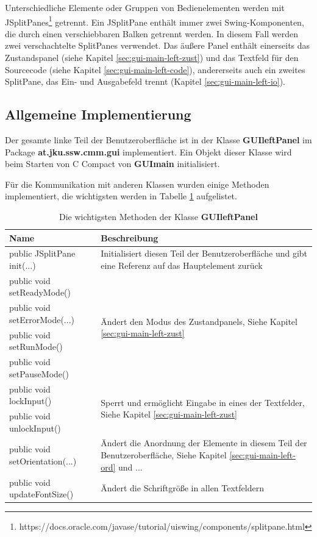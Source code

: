 Unterschiedliche Elemente oder Gruppen von Bedienelementen werden mit JSplitPanes\footnote{https://docs.oracle.com/javase/tutorial/uiswing/components/splitpane.html} getrennt. Ein JSplitPane enthält immer zwei Swing-Komponenten, die durch einen verschiebbaren Balken getrennt werden. In diesem Fall werden zwei verschachtelte SplitPanes verwendet. Das äußere Panel enthält einerseits das Zustandspanel (siehe Kapitel \ref{sec:gui-main-left-zust}) und das Textfeld für den Sourcecode (siehe Kapitel \ref{sec:gui-main-left-code}), andererseits auch ein zweites SplitPane, das Ein- und Ausgabefeld trennt (Kapitel \ref{sec:gui-main-left-io}).

\subsection{Allgemeine Implementierung}
Der gesamte linke Teil der Benutzeroberfläche ist in der Klasse \textbf{GUIleftPanel} im Package \textbf{at.jku.ssw.cmm.gui} implementiert. Ein Objekt dieser Klasse wird beim Starten von C Compact von \textbf{GUImain} initialisiert.

Für die Kommunikation mit anderen Klassen wurden einige Methoden implementiert, die wichtigsten werden in Tabelle \ref{tab:gui-main-left-methods} aufgelistet.

\def\arraystretch{1.6}
\begin{table}
\begin{tabular}{|l|p{9cm}|}
\hline
\textbf{Name}&\textbf{Beschreibung}\\
\hline
\hline
public JSplitPane init(...)&Initialisiert diesen Teil der Benutzeroberfläche und gibt eine Referenz auf das Hauptelement zurück\\
\hline
public void setReadyMode()&\multirow{4}{*}{\parbox{9cm}{Ändert den Modus des Zustandpanels, Siehe Kapitel \ref{sec:gui-main-left-zust}}}\\
public void setErrorMode(...)&\\
public void setRunMode()&\\
public void setPauseMode()&\\
\hline
public void lockInput()&\multirow{2}{*}{\parbox{9cm}{Sperrt und ermöglicht Eingabe in eines der Textfelder, Siehe Kapitel \ref{sec:gui-main-left-zust}}}\\
public void unlockInput()&\\
\hline
public void setOrientation(...)&Ändert die Anordnung der Elemente in diesem Teil der Benutzeroberfläche, Siehe Kapitel \ref{sec:gui-main-left-ord} und ...\\
\hline
public void updateFontSize()&Ändert die Schriftgröße in allen Textfeldern\\
\hline
\end{tabular}
\caption{Die wichtigsten Methoden der Klasse \textbf{GUIleftPanel}}
\label{tab:gui-main-left-methods}
\end{table}


